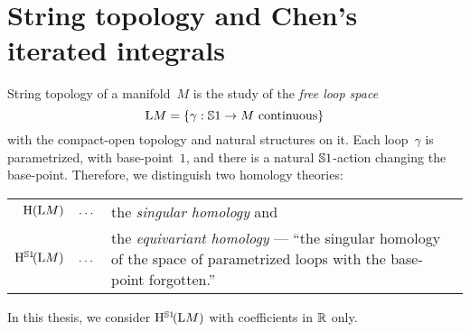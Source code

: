 \documentclass[\MainFolder/Text.tex]{subfiles}
\begin{document}
\section{String topology and Chen's iterated integrals}

String topology of a manifold~$M$ is the study of the \emph{free loop space} 
\[ \mathrm{L} M = \{\gamma: \mathbb{S}{1}\rightarrow M\text{ continuous}\} \]
with the compact-open topology and natural structures on it. Each loop~$\gamma$ is parametrized, with base-point~$1$, and there is a natural $\mathbb{S}{1}$-action changing the base-point. Therefore, we distinguish two homology theories:
\begin{center}
\begin{tabular}{rl}
 $\mathrm{H}(\mathrm{L} M)\quad\dotsc$& the \emph{singular homology} and \\[1ex]
 $\mathrm{H}^{\mathbb{S}{1}}\!(\mathrm{L} M)\quad\dotsc$ & \parbox[t]{10cm}{the \emph{equivariant homology} --- ``the singular homology of the space of parametrized loops with the base-point forgotten.''}
\end{tabular}
\end{center}
In this thesis, we consider $\mathrm{H}^{\mathbb{S}{1}}\!(\mathrm{L} M)$ with coefficients in $\mathbb{R}$ only.
\end{document}
